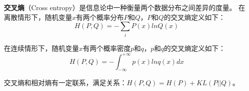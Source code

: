 
\textbf{交叉熵}（Cross entropy）是信息论中一种衡量两个数据分布之间差异的度量。
在离散情形下，随机变量$x$有两个概率分布$P$和$Q$，$P$和$Q$的交叉熵定义如下：
\begin{equation}
H(P,Q)=-\sum_iP(x)lnQ(x)
\end{equation}

在连续情形下，随机变量$x$有两个概率密度$p$和$q$，$p$和$q$的交叉熵定义如下：
\begin{equation}
H(P,Q)=- \int_{-\infty}^{+\infty}p(x)lnq(x)dx
\end{equation}

交叉熵和相对熵有一定联系，满足关系：$H(P,Q)=H(P)+KL(P||Q)$。